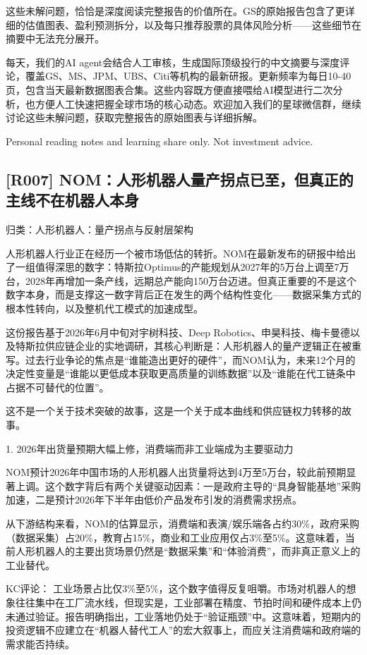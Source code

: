 \documentclass[11pt]{ctexart}
\begin{document}
这些未解问题，恰恰是深度阅读完整报告的价值所在。GS的原始报告包含了更详细的估值图表、盈利预测拆分，以及每只推荐股票的具体风险分析——这些细节在摘要中无法充分展开。

每天，我们的AI agent会结合人工审核，生成国际顶级投行的中文摘要与深度评论，覆盖GS、MS、JPM、UBS、Citi等机构的最新研报。更新频率为每日10-40页，包含当天最新数据图表合集。这些内容既方便直接喂给AI模型进行二次分析，也方便人工快速把握全球市场的核心动态。欢迎加入我们的星球微信群，继续讨论这些未解问题，获取完整报告的原始图表与详细拆解。

Personal reading notes and learning share only. Not investment advice.

\subsection{[R007] NOM：人形机器人量产拐点已至，但真正的主线不在机器人本身}
{\small\color{refgray}归类：人形机器人：量产拐点与反射层架构}

人形机器人行业正在经历一个被市场低估的转折。NOM在最新发布的研报中给出了一组值得深思的数字：特斯拉Optimus的产能规划从2027年的5万台上调至7万台，2028年再增加一条产线，远期总产能向150万台迈进。但真正重要的不是这个数字本身，而是支撑这一数字背后正在发生的两个结构性变化——数据采集方式的根本性转向，以及整机代工模式的加速成型。

这份报告基于2026年6月中旬对宇树科技、Deep Robotics、申昊科技、梅卡曼德以及特斯拉供应链企业的实地调研，其核心判断是：人形机器人的量产逻辑正在被重写。过去行业争论的焦点是“谁能造出更好的硬件”，而NOM认为，未来12个月的决定性变量是“谁能以更低成本获取更高质量的训练数据”以及“谁能在代工链条中占据不可替代的位置”。

这不是一个关于技术突破的故事，这是一个关于成本曲线和供应链权力转移的故事。

1. 2026年出货量预期大幅上修，消费端而非工业端成为主要驱动力

NOM预计2026年中国市场的人形机器人出货量将达到4万至5万台，较此前预期显著上调。这个数字背后有两个关键驱动因素：一是政府主导的“具身智能基地”采购加速，二是预计2026年下半年由低价产品发布引发的消费需求拐点。

从下游结构来看，NOM的估算显示，消费端和表演/娱乐端各占约30\%，政府采购（数据采集）占20\%，教育占15\%，商业和工业应用仅占3\%至5\%。这意味着，当前人形机器人的主要出货场景仍然是“数据采集”和“体验消费”，而非真正意义上的工业替代。

KC评论： 工业场景占比仅3\%至5\%，这个数字值得反复咀嚼。市场对机器人的想象往往集中在工厂流水线，但现实是，工业部署在精度、节拍时间和硬件成本上仍未通过验证。报告明确指出，工业落地仍处于“验证瓶颈”中。这意味着，短期内的投资逻辑不应建立在“机器人替代工人”的宏大叙事上，而应关注消费端和政府端的需求能否持续。
\end{document}
